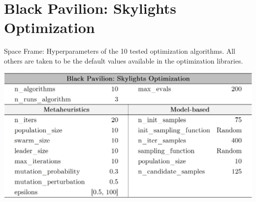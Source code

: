 \clearpage
\section{Black Pavilion: Skylights Optimization}
\label{sec:blackpavilionextra}




\begin{table}[h!]
	\centering
	\label{table:configurationsspaceframe}
	\caption[Black Pavilion: Hyperparameters of the tested optimization optimization algorithms]{Space Frame: Hyperparameters of the 10 tested optimization algorithms. All others are taken to be the default values available in the optimization libraries.}
	\includegraphics[width=\textwidth]{tables_and_code/appendices/configs_black_pavilion.PNG}
\end{table}


